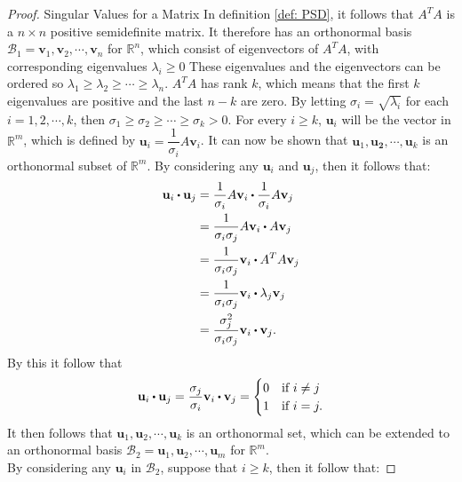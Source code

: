 \begin{proof}{Singular Values for a Matrix}
    In definition \ref{def: PSD}, it follows that $A^TA$ is a $n\times n$ positive semidefinite matrix. It therefore has an orthonormal basis $\mathcal{B}_1={\mathbf{v}_1, \mathbf{v}_2, \cdots, \mathbf{v}_n}$ for $\mathbb{R}^n$, which consist of eigenvectors of $A^TA$, with corresponding eigenvalues $\lambda_i \geq 0$
    These eigenvalues and the eigenvectors can be ordered so $\lambda_1 \geq \lambda_2 \geq \cdots \geq \lambda_n$. $A^TA$ has rank $k$, which means that the first $k$ eigenvalues are positive and the last $n-k$ are zero. By letting $\sigma_i=\sqrt{\lambda_i}$ for each $i=1, 2, \cdots, k$, then $\sigma_1 \geq \sigma_2 \geq \cdots \geq \sigma_k > 0$. 
    For every $i\geq k$, $\mathbf{u}_i$ will be the vector in $\mathbb{R}^m$, which is defined by $\mathbf{u}_i=\dfrac{1}{\sigma_i}A\mathbf{v}_i$. It can now be shown that ${\mathbf{u}_1, \mathbf{u_2}, \cdots, \mathbf{u}_k}$ is an orthonormal subset of $\mathbb{R}^m$. By considering any $\mathbf{u}_i$ and $\mathbf{u}_j$, then it follows that:
    \begin{align*}
        \mathbf{u}_i \vprik \mathbf{u}_j &= \dfrac{1}{\sigma_i}A\mathbf{v}_i \vprik \dfrac{1}{\sigma_i}A\mathbf{v}_j\\
        &=\dfrac{1}{\sigma_i\sigma_j}A\mathbf{v}_i \vprik A\mathbf{v}_j\\
        &=\dfrac{1}{\sigma_i\sigma_j}\mathbf{v}_i \vprik A^T A\mathbf{v}_j\\
        &=\dfrac{1}{\sigma_i\sigma_j}\mathbf{v}_i \vprik \lambda_j\mathbf{v}_j\\
        &=\dfrac{\sigma^2_j}{\sigma_i\sigma_j}\mathbf{v}_i \vprik \mathbf{v}_j.
    \end{align*}
    By this it follow that
    \begin{align*}
        \mathbf{u}_i \vprik \mathbf{u}_j = \dfrac{\sigma_j}{\sigma_i}\mathbf{v}_i \vprik \mathbf{v}_j=
        \begin{cases}
        0 & \text{if } i\neq j\\
        1 & \text{if } i=j.
        \end{cases}
    \end{align*}
    It then follows that ${\mathbf{u}_1, \mathbf{u}_2, \cdots, \mathbf{u}_k}$ is an orthonormal set, which can be extended to an orthonormal basis $\mathcal{B}_2={\mathbf{u}_1, \mathbf{u}_2, \cdots, \mathbf{u}_m}$ for $\mathbb{R}^m$. \\
    By considering any $\mathbf{u}_i$ in $\mathcal{B}_2$, suppose that $i\geq k$, then it follow that:

\end{proof}
